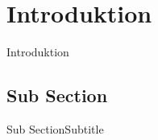 \section{Introduktion} 


\begin{frame}{Introduktion}
   
\end{frame}



\subsection{Sub Section}
\begin{frame}{Sub Section}{Subtitle}

\end{frame}


